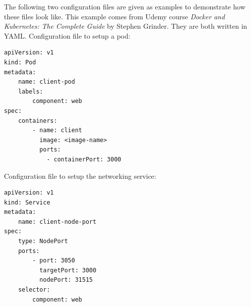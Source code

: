 The following two configuration files are given as examples \cite{stephen2023docker} to demonstrate how these files look like. This example comes from Udemy course \textit{Docker and Kubernetes: The Complete Guide} by Stephen Grinder. They are both written in YAML. Configuration file to setup a pod:
\begin{lstlisting}
apiVersion: v1
kind: Pod
metadata:
    name: client-pod
    labels:
        component: web
spec:
    containers:
        - name: client
          image: <image-name>
          ports:
          	- containerPort: 3000
\end{lstlisting}
Configuration file to setup the networking service:
\begin{lstlisting}
apiVersion: v1
kind: Service
metadata:
    name: client-node-port
spec:
    type: NodePort
    ports:
        - port: 3050
          targetPort: 3000
          nodePort: 31515
    selector:
        component: web
\end{lstlisting}

